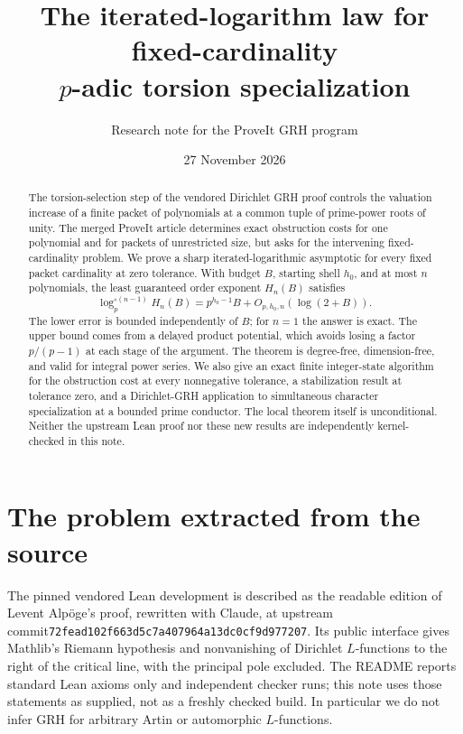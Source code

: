 \documentclass[11pt]{article}
\title{The iterated-logarithm law for fixed-cardinality\\ $p$-adic torsion specialization}
\author{Research note for the ProveIt GRH program}
\date{27 November 2026}
\theoremstyle{remark}\newtheorem{remark}[theorem]{Remark}
\newcommand{\code}[1]{\texttt{#1}}
\begin{document}
\maketitle
\begin{abstract}
The torsion-selection step of the vendored Dirichlet GRH proof controls the valuation increase of a finite packet of polynomials at a common tuple of prime-power roots of unity. The merged ProveIt article determines exact obstruction costs for one polynomial and for packets of unrestricted size, but asks for the intervening fixed-cardinality problem. We prove a sharp iterated-logarithmic asymptotic for every fixed packet cardinality at zero tolerance. With budget $B$, starting shell $h_0$, and at most $n$ polynomials, the least guaranteed order exponent $H_n(B)$ satisfies
\[
 \log_p^{\circ(n-1)} H_n(B)=p^{h_0-1} B+O_{p,h_0,n}(\log(2+B)).
\]
The lower error is bounded independently of $B$; for $n=1$ the answer is exact. The upper bound comes from a delayed product potential, which avoids losing a factor $p/(p-1)$ at each stage of the argument. The theorem is degree-free, dimension-free, and valid for integral power series. We also give an exact finite integer-state algorithm for the obstruction cost at every nonnegative tolerance, a stabilization result at tolerance zero, and a Dirichlet-GRH application to simultaneous character specialization at a bounded prime conductor. The local theorem itself is unconditional. Neither the upstream Lean proof nor these new results are independently kernel-checked in this note.
\end{abstract}

\section{The problem extracted from the source}
The pinned vendored Lean development \cite{vendor,leanreadme} is described as the readable edition of Levent Alp\"oge's proof, rewritten with Claude, at upstream commit\newline \code{72fead102f663d5c7a407964a13dc0cf9d977207}. Its public interface \cite{statements,main} gives Mathlib's Riemann hypothesis and nonvanishing of Dirichlet $L$-functions to the right of the critical line, with the principal pole excluded. The README reports standard Lean axioms only and independent checker runs; this note uses those statements as supplied, not as a freshly checked build. In particular we do not infer GRH for arbitrary Artin or automorphic $L$-functions.
\end{document}
